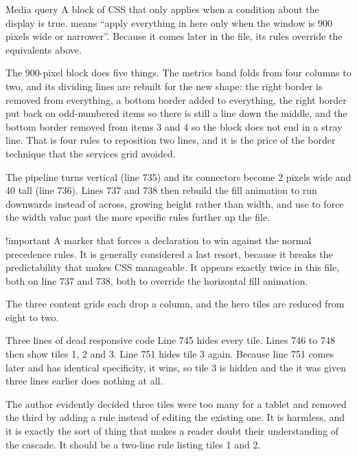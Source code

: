 \begin{jargon}{Media query}
A block of CSS that only applies when a condition about the display is true.
 means ``apply everything in here only when the
window is 900 pixels wide or narrower''. Because it comes later in the file, its
rules override the equivalents above.
\end{jargon}

The 900-pixel block does five things. The metrics band folds from four columns to
two, and its dividing lines are rebuilt for the new shape: the right border is
removed from everything, a bottom border added to everything, the right border put
back on odd-numbered items so there is still a line down the middle, and the bottom
border removed from items 3 and 4 so the block does not end in a stray line. That
is four rules to reposition two lines, and it is the price of the border technique
that the services grid avoided.

The pipeline turns vertical (line 735) and its connectors become 2 pixels wide and
40 tall (line 736). Lines 737 and 738 then rebuild the fill animation to run
downwards instead of across, growing height rather than width, and use
 to force the width value past the more specific rules further up
the file.

\begin{jargon}{!important}
A marker that forces a declaration to win against the normal precedence rules. It
is generally considered a last resort, because it breaks the predictability that
makes CSS manageable. It appears exactly twice in this file, both on line 737 and
738, both to override the horizontal fill animation.
\end{jargon}

The three content grids each drop a column, and the hero tiles are reduced from
eight to two.

\begin{honest}{Three lines of dead responsive code}
Line 745 hides every tile. Lines 746 to 748 then show tiles 1, 2 and 3. Line 751
hides tile 3 again. Because line 751 comes later and has identical specificity, it
wins, so tile 3 is hidden and the  it was given three lines
earlier does nothing at all.

The author evidently decided three tiles were too many for a tablet and removed the
third by adding a rule instead of editing the existing one. It is harmless, and it
is exactly the sort of thing that makes a reader doubt their understanding of the
cascade. It should be a two-line rule listing tiles 1 and 2.
\end{honest}

